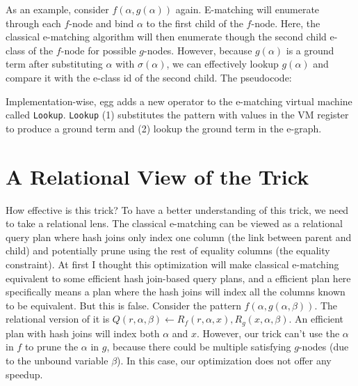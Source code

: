 As an example, consider \(f(\alpha, g(\alpha))\) again.
E-matching will
 enumerate through each \(f\)-node and bind \(\alpha\) to the first child
 of the \(f\)-node.
Here, the classical e-matching algorithm will then
 enumerate though the second child e-class of the \(f\)-node for possible
 \(g\)-nodes.
However, because \(g(\alpha)\) is a ground term after
 substituting \(\alpha\) with \(\sigma(\alpha)\), we can effectively
 lookup \(g(\alpha)\) and compare it with the e-class id of the second
 child.
The pseudocode:
\begin{Shaded}
\begin{Highlighting}[]
    \OperatorTok{!=}

\OperatorTok{=}
    \OperatorTok{!=}
\end{Highlighting}
\end{Shaded}

Implementation-wise, egg adds a new operator to the e-matching virtual
 machine called \texttt{Lookup}.
\texttt{Lookup} (1) substitutes the
 pattern with values in the VM register to produce a ground term and (2)
 lookup the ground term in the e-graph.

\section{A Relational View of the Trick}\label{a-relational-view-of-the-trick}

How effective is this trick? To have a better understanding of this
 trick, we need to take a relational lens.
The classical e-matching can be
 viewed as a relational query plan where hash joins only index one column
 (the link between parent and child) and potentially prune using the rest
 of equality columns (the equality constraint).
At first I thought this
 optimization will make classical e-matching equivalent to some efficient
 hash join-based query plans, 
 and a efficient plan here specifically means a plan
 where the hash joins will index all the columns known to be equivalent.
But this is false.
Consider the pattern \(f(\alpha, g(\alpha,\beta))\).
The relational version of it is
 \(Q(r, \alpha,\beta)\gets R_f(r, \alpha, x),R_g(x,\alpha,\beta)\).
An efficient plan with hash joins will index both \(\alpha\) and \(x\).
However,
 our trick can't use the \(\alpha\) in \(f\) to prune the
 \(\alpha\) in \(g\), because there could be multiple satisfying
 \(g\)-nodes (due to the unbound variable \(\beta\)).
In this case, our
 optimization does not offer any speedup.

